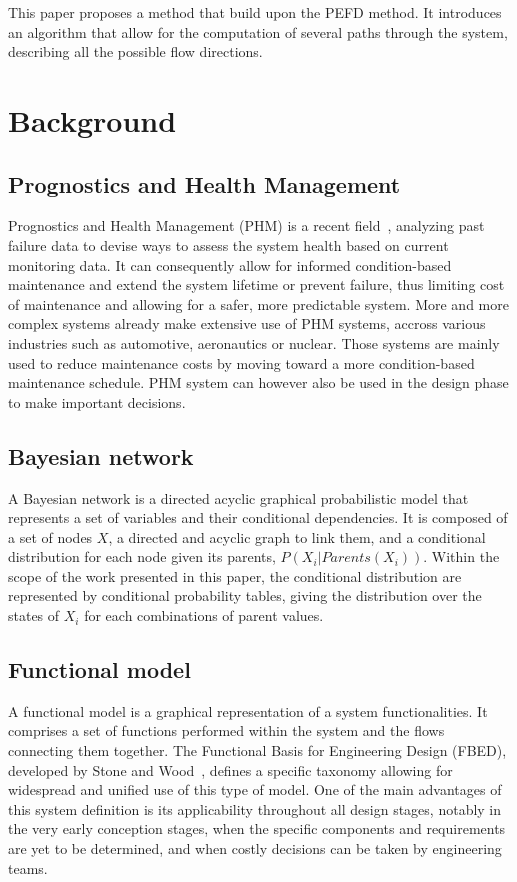 This paper proposes a method that build upon the PEFD method. It introduces an algorithm that allow for the computation of several paths through the system, describing all the possible flow directions.

\section{Background}

\subsection{Prognostics and Health Management}

Prognostics and Health Management (PHM) is a recent field~\cite{phm1}, analyzing past failure data to devise ways to assess the system health based on current monitoring data. It can consequently allow for informed condition-based maintenance and extend the system lifetime or prevent failure, thus limiting cost of maintenance and allowing for a safer, more predictable system. More and more complex systems already make extensive use of PHM systems, accross various industries such as automotive, aeronautics or nuclear. Those systems are mainly used to reduce maintenance costs by moving toward a more condition-based maintenance schedule. PHM system can however also be used in the design phase to make important decisions.


\subsection{Bayesian network}

A Bayesian network is a directed acyclic graphical probabilistic model that represents a set of variables and their conditional dependencies. It is composed of a set of nodes $X$, a directed and acyclic graph to link them, and a conditional distribution for each node given its parents, $P(X_i | Parents(X_i))$. Within the scope of the work presented in this paper, the conditional distribution are represented by conditional probability tables, giving the distribution over the states of $X_i$ for each combinations of parent values.

\subsection{Functional model}

A functional model is a graphical representation of a system functionalities. It comprises a set of functions performed within the system and the flows connecting them together. The Functional Basis for Engineering Design (FBED), developed by Stone and Wood~\cite{stone}, defines a specific taxonomy allowing for widespread and unified use of this type of model. One of the main advantages of this system definition is its applicability throughout all design stages, notably in the very early conception stages, when the specific components and requirements are yet to be determined, and when costly decisions can be taken by engineering teams.

